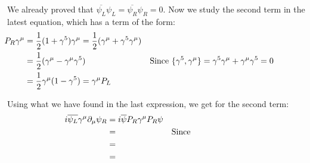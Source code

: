 We already proved that $\overline{\psi_L}\psi_L = \overline{\psi_R}\psi_R = 0$. Now we study the second term in the latest equation, which has a term of the form:
\begin{align*}
  &\begin{aligned}
     \mathllap{P_R\gamma^\mu}  &= \frac{1}{2} (1 + \gamma^5)\gamma^\mu = \frac{1}{2} (\gamma^\mu + \gamma^5 \gamma^\mu) \\        
     \mathllap{}            &= \frac{1}{2} (\gamma^\mu - \gamma^\mu \gamma^5) && \text{Since $\{\gamma^5,\gamma^\mu\} = \gamma^5\gamma^\mu + \gamma^\mu \gamma^5 = 0$} \\
     \mathllap{}            &= \frac{1}{2} \gamma^\mu (1 - \gamma^5) = \gamma^\mu P_L 
  &\end{aligned}
\end{align*}

Using what we have found in the last expression, we get for the second term:
\begin{align*}
  &\begin{aligned}
     \mathllap{i\overline{\psi_L}\gamma^\mu \partial_\mu \psi_R}  &=  i \overline{\psi}P_R \gamma^\mu P_R \psi\\        
     \mathllap{}            &=  && \text{Since} \\
     \mathllap{}            &=  \\
     \mathllap{}            &= 
  &\end{aligned}
\end{align*}








